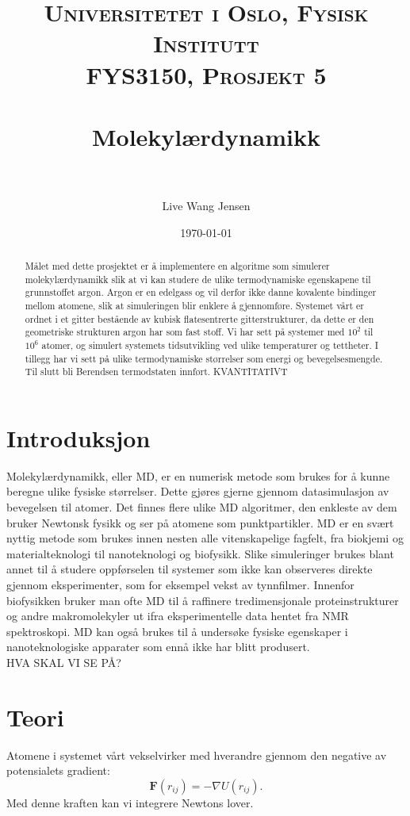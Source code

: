 \documentclass[paper=a4, fontsize=11pt]{scrartcl} %
\title{	
\normalfont \normalsize 
\textsc{Universitetet i Oslo, Fysisk Institutt \\
										FYS3150, Prosjekt 5} \\ [25pt] %
\horrule{0.5pt} \\[0.4cm] %
\huge Molekylærdynamikk \\ %
\horrule{2pt} \\[0.5cm] %
}
\author{Live Wang Jensen} %
\date{\normalsize\today} %
\numberwithin{equation}{section} %
\numberwithin{figure}{section} %
\numberwithin{table}{section} %
\begin{document}
\maketitle 
\begin{abstract}
Målet med dette prosjektet er å implementere en algoritme som simulerer molekylærdynamikk slik at vi kan studere de ulike termodynamiske egenskapene til grunnstoffet argon. Argon er en edelgass og vil derfor ikke danne kovalente bindinger mellom atomene, slik at simuleringen blir enklere å gjennomføre. Systemet vårt er ordnet i et gitter bestående av kubisk flatesentrerte gitterstrukturer, da dette er den geometriske strukturen argon har som fast stoff. Vi har sett på systemer med $10^2$ til $10^6$ atomer, og simulert systemets tidsutvikling ved ulike temperaturer og tettheter. I tillegg har vi sett på ulike termodynamiske størrelser som energi og bevegelsesmengde. Til slutt bli Berendsen termodstaten innført.
KVANTITATIVT

\end{abstract}

\tableofcontents


\section{Introduksjon}
Molekylærdynamikk, eller MD, er en numerisk metode som brukes for å kunne beregne ulike fysiske størrelser. Dette gjøres gjerne gjennom datasimulasjon av bevegelsen til atomer. Det finnes flere ulike MD algoritmer, den enkleste av dem bruker Newtonsk fysikk og ser på atomene som punktpartikler. MD er en svært nyttig metode som brukes innen nesten alle vitenskapelige fagfelt, fra biokjemi og materialteknologi til nanoteknologi og biofysikk. Slike simuleringer brukes blant annet til å studere oppførselen til systemer som ikke kan observeres direkte gjennom eksperimenter, som for eksempel vekst av tynnfilmer. Innenfor biofysikken bruker man ofte MD til å raffinere tredimensjonale proteinstrukturer og andre makromolekyler ut ifra eksperimentelle data hentet fra NMR spektroskopi. MD kan også brukes til å undersøke fysiske egenskaper i nanoteknologiske apparater som ennå ikke har blitt produsert. 
\\
HVA SKAL VI SE PÅ?




\section{Teori}
Atomene i systemet vårt vekselvirker med hverandre gjennom den negative av potensialets gradient:
\begin{equation}
\textbf{F}(r_{ij}) = - \nabla U(r_{ij}).
\end{equation}
Med denne kraften kan vi integrere Newtons lover. 
\end{document}
